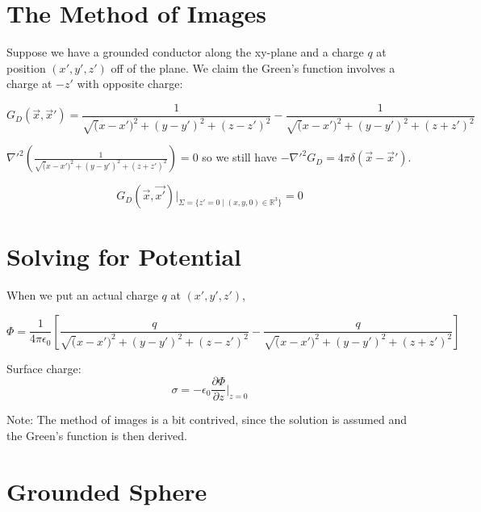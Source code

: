 \documentclass[a4paper,twoside,master.tex]{subfiles}
\begin{document}

\section*{The Method of Images}%
\label{sec:the_method_of_images}

Suppose we have a grounded conductor along the xy-plane and a charge $q$ at position $(x',y',z')$ off of the plane. We claim the Green's function involves a charge at $-z'$ with opposite charge:

\begin{equation}
   G_D(\vec{x},\vec{x}') = \frac{1}{\sqrt(x-x')^2+(y-y')^2+(z-z')^2} - \frac{1}{\sqrt(x-x')^2+(y-y')^2+(z+z')^2}
\end{equation}

$\nabla'^2\left(\frac{1}{\sqrt(x-x')^2+(y-y')^2+(z+z')^2}\right) = 0$ so we still have $-\nabla'^2G_D=4\pi\delta(\vec{x}-\vec{x}')$.

\begin{equation}
   G_D(\vec{x},\vec{x'})\bigg|_{\Sigma = \{z'=0\mid(x,y,0)\in\mathbb{R}^3\}} = 0
\end{equation}

\section*{Solving for Potential}%
\label{sec:solving_for_potential}

When we put an actual charge $q$ at $(x',y',z')$,

\begin{equation}
   \Phi = \frac{1}{4\pi\epsilon_0}\left[\frac{q}{\sqrt(x-x')^2+(y-y')^2+(z-z')^2} - \frac{q}{\sqrt(x-x')^2+(y-y')^2+(z+z')^2}\right]
\end{equation}

Surface charge:
\begin{equation}
   \sigma = -\epsilon_0\frac{\partial\Phi}{\partial z}\bigg|_{z=0}
\end{equation}

\begin{note}{Note:}
The method of images is a bit contrived, since the solution is assumed and the Green's function is then derived.
\end{note}

\section*{Grounded Sphere}%
\label{sec:grounded_sphere}
\end{document}
